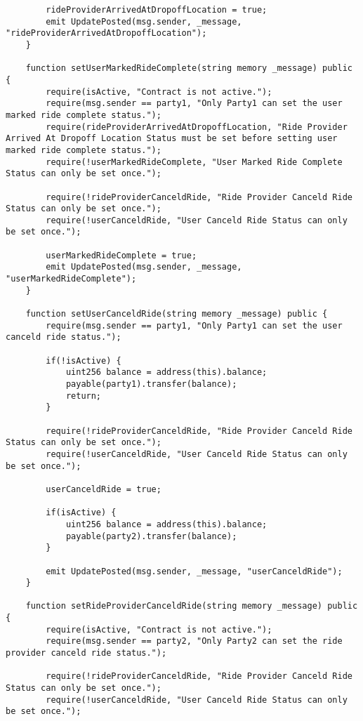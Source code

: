 \begin{lstlisting}
        rideProviderArrivedAtDropoffLocation = true;
        emit UpdatePosted(msg.sender, _message, "rideProviderArrivedAtDropoffLocation");
    }

    function setUserMarkedRideComplete(string memory _message) public {
        require(isActive, "Contract is not active.");
        require(msg.sender == party1, "Only Party1 can set the user marked ride complete status.");
        require(rideProviderArrivedAtDropoffLocation, "Ride Provider Arrived At Dropoff Location Status must be set before setting user marked ride complete status.");
        require(!userMarkedRideComplete, "User Marked Ride Complete Status can only be set once.");

        require(!rideProviderCanceldRide, "Ride Provider Canceld Ride Status can only be set once.");
        require(!userCanceldRide, "User Canceld Ride Status can only be set once.");

        userMarkedRideComplete = true;
        emit UpdatePosted(msg.sender, _message, "userMarkedRideComplete");
    }

    function setUserCanceldRide(string memory _message) public {
        require(msg.sender == party1, "Only Party1 can set the user canceld ride status.");
        
        if(!isActive) {
            uint256 balance = address(this).balance;
            payable(party1).transfer(balance);
            return;
        }

        require(!rideProviderCanceldRide, "Ride Provider Canceld Ride Status can only be set once.");
        require(!userCanceldRide, "User Canceld Ride Status can only be set once.");

        userCanceldRide = true;
        
        if(isActive) {
            uint256 balance = address(this).balance;
            payable(party2).transfer(balance);
        }
        
        emit UpdatePosted(msg.sender, _message, "userCanceldRide");
    }

    function setRideProviderCanceldRide(string memory _message) public {
        require(isActive, "Contract is not active.");
        require(msg.sender == party2, "Only Party2 can set the ride provider canceld ride status.");
        
        require(!rideProviderCanceldRide, "Ride Provider Canceld Ride Status can only be set once.");
        require(!userCanceldRide, "User Canceld Ride Status can only be set once.");


\end{lstlisting}

